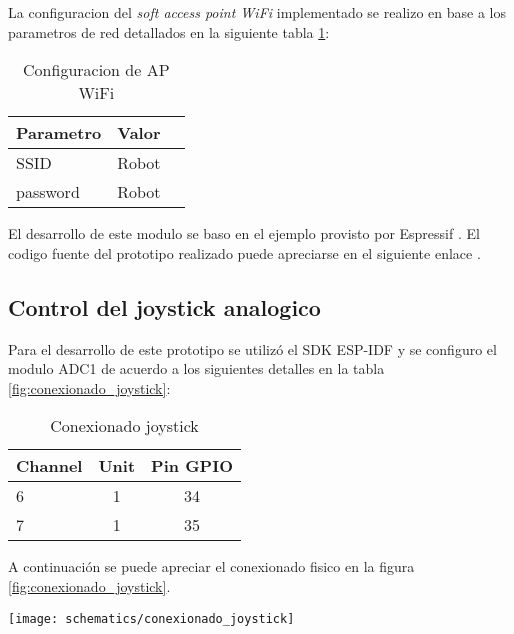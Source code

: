 La configuracion del \textit{soft access point WiFi} implementado se realizo en base a los parametros de red detallados en la siguiente tabla  \ref{tab:configuracion_wifi}: 

\vspace{0.5cm}
\begin{table}[h]
\centering
\caption[Configuracion de AP WiFi]{Configuracion de AP WiFi}
\begin{tabular}{l c c}
\toprule
\textbf{Parametro} & \textbf{Valor} \\
\midrule
SSID & Robot  \\
password & Robot  \\
\bottomrule
\hline
\end{tabular}
\label{tab:configuracion_wifi}
\end{table}  


El desarrollo de este modulo se baso en el ejemplo provisto por Espressif \cite{ESP32_WiFi_SoftAP}. El codigo fuente del prototipo realizado puede apreciarse en el siguiente enlace \cite{ESP32_POC_WiFi}.


\subsection{Control del joystick analogico}
Para el desarrollo de este prototipo se utilizó el SDK ESP-IDF y se configuro el modulo ADC1 de acuerdo a los siguientes detalles en la tabla \ref{fig:conexionado_joystick}:

\vspace{0.5cm}
\begin{table}[h]
\centering
\caption[Conexionado joystick]{Conexionado joystick}
\begin{tabular}{l c c}
\toprule
\textbf{Channel} & \textbf{Unit} & \textbf{Pin GPIO}\\
\midrule
6 & 1 & 34 \\
7 & 1 & 35 \\
\bottomrule
\hline
\end{tabular}
\label{tab:conexionado_joystick}
\end{table}

A continuación se puede apreciar el conexionado fisico en la figura \ref{fig:conexionado_joystick}.

\begin{center}
  \texttt{[image: schematics/conexionado\_joystick]}
    \label{fig:conexionado_joystick}
\end{center}


